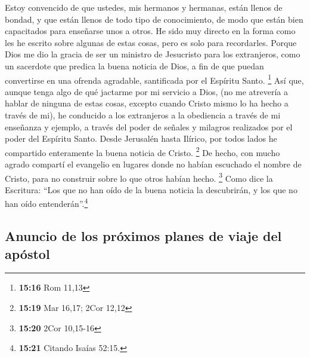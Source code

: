  Estoy convencido de que ustedes, mis hermanos y
hermanas, están llenos de bondad, y que están llenos de todo tipo de
conocimiento, de modo que están bien capacitados para enseñarse unos a
otros.  He sido muy directo en la forma como les he
escrito sobre algunas de estas cosas, pero es solo para recordarles.
Porque Dios me dio la gracia  de ser un ministro de
Jesucristo para los extranjeros, como un sacerdote que predica la buena
noticia de Dios, a fin de que puedan convertirse en una ofrenda
agradable, santificada por el Espíritu Santo. \footnote{\textbf{15:16}
  Rom 11,13}  Así que, aunque tenga algo de qué jactarme
por mi servicio a Dios,  (no me atrevería a hablar de
ninguna de estas cosas, excepto cuando Cristo mismo lo ha hecho a través
de mi), he conducido a los extranjeros a la obediencia a través de mi
enseñanza y ejemplo,  a través del poder de señales y
milagros realizados por el poder del Espíritu Santo. Desde Jerusalén
hasta Ilírico, por todos lados he compartido enteramente la buena
noticia de Cristo. \footnote{\textbf{15:19} Mar 16,17; 2Cor 12,12}
 De hecho, con mucho agrado compartí el evangelio en
lugares donde no habían escuchado el nombre de Cristo, para no construir
sobre lo que otros habían hecho. \footnote{\textbf{15:20} 2Cor 10,15-16}
 Como dice la Escritura: ``Los que no han oído de la
buena noticia la descubrirán, y los que no han oído
entenderán''.\footnote{\textbf{15:21} Citando Isaías 52:15.}

\hypertarget{anuncio-de-los-pruxf3ximos-planes-de-viaje-del-apuxf3stol}{%
\subsection{Anuncio de los próximos planes de viaje del
apóstol}\label{anuncio-de-los-pruxf3ximos-planes-de-viaje-del-apuxf3stol}}

